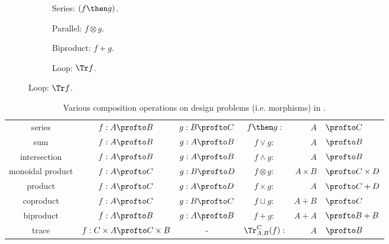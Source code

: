 \begin{figure}[h!]
\centering
\begin{subfigure}{0.2\textwidth}
\centering
{}
\caption{Series: $(f \then g)$.}
\end{subfigure}
\hspace{10mm} %
\begin{subfigure}{0.2\textwidth}
\centering
{}
\caption{Parallel: $f \otimes g$.}
\end{subfigure}
\hspace{10mm} %
\begin{subfigure}{0.2\textwidth}
\centering
{}
\caption{Biproduct: $f + g$.}
\end{subfigure}
\hspace{10mm} %
\begin{subfigure}{0.2\textwidth}
\centering
{}
\caption{Loop: $\Tr f$.}
\end{subfigure}
\label{fig:diagrams}
\end{figure}

\begin{table}[t!]
    \centering
\begin{tabular}{c|c|c|crl}
    series &
    $f:A\profto B$&
    $g:B\profto C$&
    $f\then g:$&$A$&$\profto C$ \\
    sum &
    $f:A\profto B$ &
    $g:A\profto B$ &
    $f\vee g:$&$A$&$\profto B$ \\
    intersection &
    $f:A\profto B$ &
    $g:A\profto B$ &
    $f\wedge g:$&$A$&$\profto B$ \\
    monoidal product &
    $f:A\profto C$&
    $g:B\profto D$ &
    $f\otimes g:$&$A\times B$&$\profto C \times D$ \\
    product &
    $f:A\profto C$&
    $g:A\profto D$ &
    $f\times g:$&$A $&$\profto C + D$ \\
    coproduct &
    $f:A\profto C$&
    $g:B\profto C$ &
    $f\sqcup g:$&$A + B $&$\profto C$ \\
    biproduct &
    $f:A\profto B$ &
    $g:A\profto B$ &
    $f+ g:$&$A + A$&$\profto B + B$ \\
    trace &
    $f: C \times A \profto C \times B$ &
    -&
    $\Tr_{A,B}^C(f) :$&$A$&$\profto B$
\end{tabular}
    \caption{Various composition operations on design problems (i.e. morphisms) in \DP.}
\end{table}
